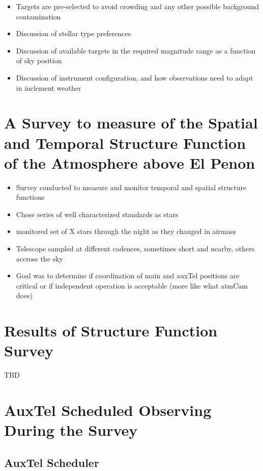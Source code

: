 \begin{itemize}
	\item Targets are pre-selected to avoid crowding and any other possible background contamination
	\item Discussion of stellar type preferences
	\item Discussion of available targets in the required magnitude range as a function of sky position
	\item Discussion of instrument configuration, and how observations need to adapt in inclement weather
\end{itemize}



\section{A Survey to measure of the Spatial and Temporal Structure Function of the Atmosphere above El Penon}

\begin{itemize}
	\item Survey conducted to measure and monitor temporal and spatial structure functions
	\item Chose series of well characterized standards as stars
	\item monitored set of X stars through the night as they changed in airmass
	\item Telescope sampled at different cadences, sometimes short and nearby, others accross the sky
	\item Goal was to determine if coordination of main and auxTel positions are critical or if independent operation is acceptable (more like what atmCam does)
\end{itemize}

\section{Results of Structure Function Survey}

TBD

\section{AuxTel Scheduled Observing During the Survey}

\subsection{AuxTel Scheduler}

